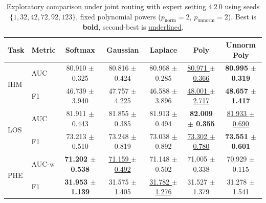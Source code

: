 \begin{table}[h]
\centering
\small
\setlength{\tabcolsep}{4pt}
\begin{tabular}{llccccc}
\toprule
Task & Metric & Softmax & Gaussian & Laplace & Poly & Unnorm Poly \\
\midrule
\multirow{2}{*}{IHM} & AUC & 80.910 $\pm$ 0.325 & 80.816 $\pm$ 0.424 & 80.968 $\pm$ 0.285 & \underline{80.971 $\pm$ 0.366} & \textbf{80.995 $\pm$ 0.319} \\
 & F1 & 46.739 $\pm$ 3.940 & 47.757 $\pm$ 4.225 & 46.588 $\pm$ 3.896 & \underline{48.001 $\pm$ 2.717} & \textbf{48.657 $\pm$ 1.417} \\
\midrule
\multirow{2}{*}{LOS} & AUC & 81.911 $\pm$ 0.443 & 81.855 $\pm$ 0.385 & 81.913 $\pm$ 0.494 & \textbf{82.009 $\pm$ 0.355} & \underline{81.933 $\pm$ 0.690} \\
 & F1 & 73.213 $\pm$ 0.510 & 73.248 $\pm$ 0.819 & 73.038 $\pm$ 0.892 & \underline{73.302 $\pm$ 0.780} & \textbf{73.551 $\pm$ 0.601} \\
\midrule
\multirow{2}{*}{PHE} & AUC-w & \textbf{71.202 $\pm$ 0.538} & \underline{71.159 $\pm$ 0.492} & 71.148 $\pm$ 0.502 & 71.005 $\pm$ 0.338 & 70.929 $\pm$ 0.115 \\
 & F1 & \textbf{31.953 $\pm$ 1.139} & 31.575 $\pm$ 1.405 & \underline{31.782 $\pm$ 1.276} & 31.527 $\pm$ 1.379 & 31.278 $\pm$ 1.541 \\
\bottomrule
\end{tabular}
\caption{Exploratory comparison under joint routing with expert setting $4\ 2\ 0$ using seeds $\{1,32,42,72,92,123\}$, fixed polynomial powers ($p_\text{norm}=2$, $p_\text{unnorm}=2$). Best is \textbf{bold}, second-best is \underline{underlined}.}
\label{tab:explore_dominance2_constp2p2_6seed_132427292123_joint420_gating_table}
\end{table}
